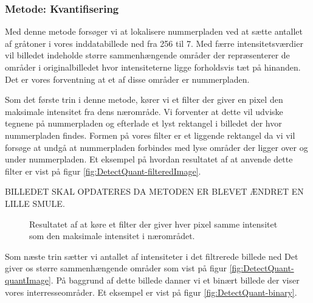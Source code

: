 \subsubsection{Metode: Kvantifisering}
Med denne metode forsøger vi at lokalisere nummerpladen ved at sætte antallet af gråtoner i vores inddatabillede ned fra 256 til 7. Med færre intensitetsværdier vil billedet indeholde større sammenhængende områder der repræsenterer de områder i originalbilledet hvor intensiteterne ligge forholdsvis tæt på hinanden. Det er vores forventning at et af disse områder er nummerpladen.

Som det første trin i denne metode, kører vi et filter der giver en pixel den maksimale intensitet fra dens nærområde. Vi forventer at dette vil udviske tegnene på nummerpladen og efterlade et lyst rektangel i billedet der hvor nummerpladen findes. Formen på vores filter er et liggende rektangel da vi vil forsøge at undgå at nummerpladen forbindes med lyse områder der ligger over og under nummerpladen. Et eksempel på hvordan resultatet af at anvende dette filter er vist på figur \vref{fig:DetectQuant-filteredImage}.

BILLEDET SKAL OPDATERES DA METODEN ER BLEVET ÆNDRET EN LILLE SMULE.
\begin{figure}[htp]
  \centering
  \caption{Resultatet af at køre et filter der giver hver pixel samme intensitet som den maksimale intensitet i nærområdet.}
  \label{fig:DetectQuant-filteredImage}  
\end{figure}

Som næste trin sætter vi antallet af intensiteter i det filtrerede billede ned Det giver os større sammenhængende områder som vist på figur \vref{fig:DetectQuant-quantImage}. På baggrund af dette billede danner vi et binært billede der viser vores interresseområder. Et eksempel er vist på figur \vref{fig:DetectQuant-binary}.

